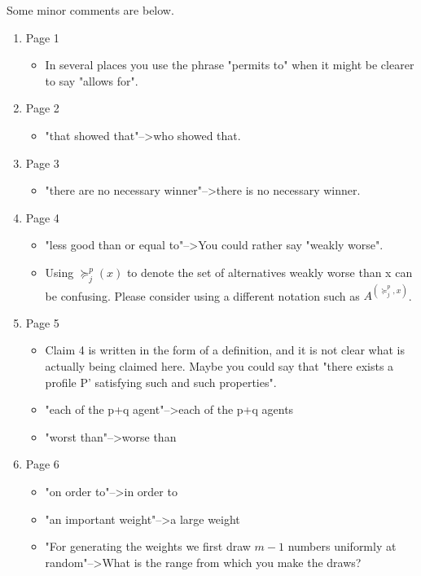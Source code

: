 \documentclass[version=3.21, pagesize, twoside=off, bibliography=totoc, DIV=calc, fontsize=12pt, a4paper]{scrartcl}
\begin{document}
Some minor comments are below.
\begin{enumerate}
\item Page 1
\begin{itemize}
	\item In several places you use the phrase "permits to" when it might be clearer to say "allows for".
\end{itemize}

\item Page 2
\begin{itemize}
	\item "that showed that"-->who showed that.
\end{itemize}

\item Page 3 
\begin{itemize}
	\item "there are no necessary winner"-->there is no necessary winner.
\end{itemize}

\item Page 4 
\begin{itemize}
	\item "less good than or equal to"-->You could rather say "weakly worse".
	\item Using $\succeq^p_j(x)$ to denote the set of alternatives weakly worse than x can be confusing. Please consider using a different notation such as $A^(\succeq^p_j,x)$.
\end{itemize}

\item Page 5
\begin{itemize}
	\item Claim 4 is written in the form of a definition, and it is not clear what is actually being claimed here. Maybe you could say that "there exists a profile P' satisfying such and such properties".
	\item "each of the p+q agent"-->each of the p+q agents
	\item "worst than"-->worse than
\end{itemize}

\item Page 6 
\begin{itemize}
	\item "on order to"-->in order to
	\item "an important weight"-->a large weight
	\item "For generating the weights we first draw $m - 1$ numbers uniformly at random"-->What is the range from which you make the draws?
\end{itemize}


\end{enumerate}
\end{document}
